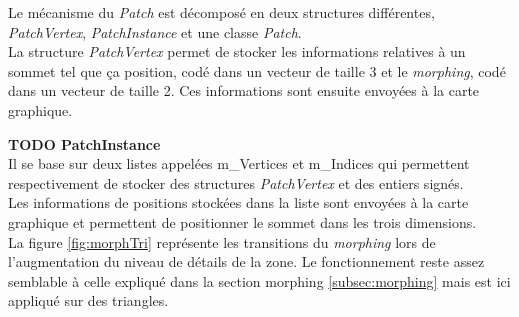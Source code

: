   Le mécanisme du \textit{Patch} est décomposé en deux structures différentes,
  \textit{PatchVertex}, \textit{PatchInstance} et une classe \textit{Patch}.\\
 
  La structure \textit{PatchVertex} permet de stocker les informations relatives à un sommet tel que ça position, codé dans un vecteur de taille 3 et le \textit{morphing}, codé dans un vecteur de taille 2. Ces informations sont ensuite envoyées à la carte graphique.
  
  \textbf{TODO PatchInstance}\\
  
  Il se base sur deux listes appelées m\_Vertices et m\_Indices qui permettent respectivement de stocker des structures \textit{PatchVertex} et des entiers signés.\\
  
  Les informations de positions stockées dans la liste sont envoyées à la carte graphique et permettent de positionner le sommet dans les trois dimensions.\\
  
  La figure \ref{fig:morphTri} représente les transitions du \textit{morphing} lors de l'augmentation du niveau de détails de la zone. Le fonctionnement reste assez semblable à celle expliqué dans la section morphing \ref{subsec:morphing} mais est ici appliqué sur des triangles.
  	
